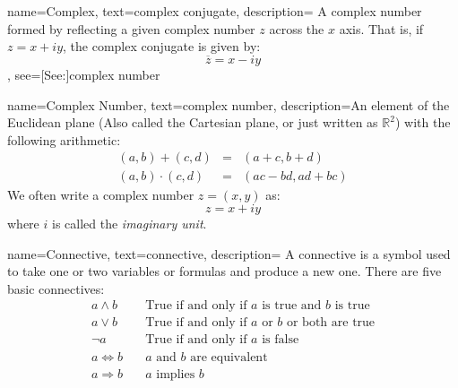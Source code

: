 {
    name={Complex},
    text={complex conjugate},
    description={
        A complex number formed by reflecting a given complex number $z$
        across the $x$ axis. That is, if $z=x+iy$, the complex
        conjugate is given by:
        \begin{equation*}
            \overline{z}=x-iy
        \end{equation*}
    },
    see=[See:]{complex number}
}

{
    name={Complex Number},
    text={complex number},
    description={An element of the Euclidean plane (Also called the
                 Cartesian plane, or just written as $\mathbb{R}^{2}$)
                 with the following arithmetic:
                 \begin{eqnarray*}
                     (a,b)+(c,d)
                     \!&\!=\!&\!(a+c,b+d)\\
                     (a,b)\cdot(c,d)
                     \!&\!=\!&\!(ac-bd,ad+bc)
                 \end{eqnarray*}
                 We often write a complex number $z=(x,y)$ as:
                 \begin{equation*}
                     z=x+iy
                 \end{equation*}
                 where $i$ is called the \textit{imaginary unit}.
                }
}

{
    name={Connective},
    text={connective},
    description={
        A connective is a symbol used to take one or two variables or formulas
        and produce a new one. There are five basic connectives:
        {%
            \begin{align*}
                a\land{b}\quad
                &\textrm{True if and only if }a
                \textrm{ is true and }b\textrm{ is true}\\
                a\lor{b}\quad
                &\textrm{True if and only if }a
                \textrm{ or }b\textrm{ or both are true}\\
                \neg{a}\quad
                &\textrm{True if and only if }a\textrm{ is false}\\
                a\Leftrightarrow{b}\quad
                &a\textrm{ and }b\textrm{ are equivalent}\\
                a\Rightarrow{b}\quad
                &a\textrm{ implies }b
            \end{align*}
        }%
    }
}


